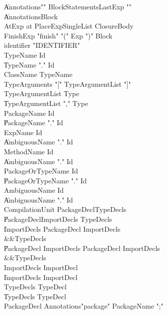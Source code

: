 \begin{grammar}

    \|   Annotations\opt  \xcd"{"  BlockStatements\opt  LastExp  \xcd"}"\\
    \|   Annotations\opt  Block\\
 AtExp  \:   at  PlaceExpSingleList  ClosureBody\\
 FinishExp  \:   \xcd"finish"  \xcd"("  Exp  \xcd")"  Block\\
 identifier  \:   \xcd"IDENTIFIER"  \\
 TypeName  \:   Id\\
    \|   TypeName  \xcd"."  Id\\
 ClassName  \:   TypeName\\
 TypeArguments  \:   \xcd"["  TypeArgumentList  \xcd"]"\\
 TypeArgumentList  \:   Type\\
    \|   TypeArgumentList  \xcd","  Type\\
 PackageName  \:   Id\\
    \|   PackageName  \xcd"."  Id\\
 ExpName  \:   Id\\
    \|   AmbiguousName  \xcd"."  Id\\
 MethodName  \:   Id\\
    \|   AmbiguousName  \xcd"."  Id\\
 PackageOrTypeName  \:   Id\\
    \|   PackageOrTypeName  \xcd"."  Id\\
 AmbiguousName  \:   Id\\
    \|   AmbiguousName  \xcd"."  Id\\
 CompilationUnit  \:   PackageDecl\opt  TypeDecls\opt\\
    \|   PackageDecl\opt  ImportDecls  TypeDecls\opt\\
    \|   ImportDecls  PackageDecl    ImportDecls\opt  \\
          &&TypeDecls\opt\\
    \|   PackageDecl  ImportDecls  PackageDecl    ImportDecls\opt  \\
          &&TypeDecls\opt\\
 ImportDecls  \:   ImportDecl\\
    \|   ImportDecls  ImportDecl\\
 TypeDecls  \:   TypeDecl\\
    \|   TypeDecls  TypeDecl\\
 PackageDecl  \:   Annotations\opt  \xcd"package"  PackageName  \xcd";"\\

\end{grammar}
